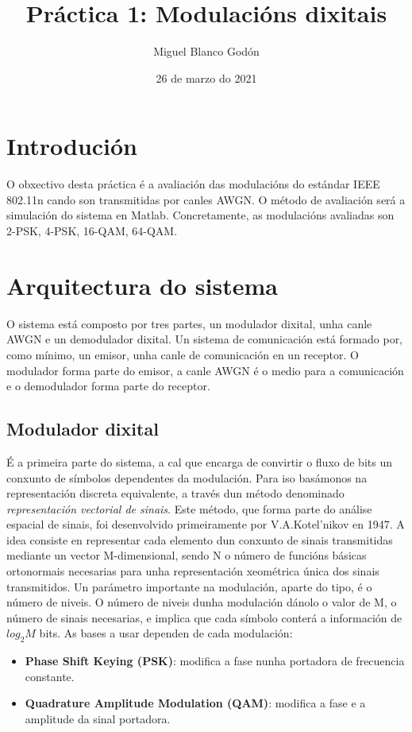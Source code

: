 \documentclass[
	10pt, %
	spanish, %
]{fphw}
\title{Práctica 1: Modulacións dixitais}
\author{Miguel Blanco Godón}
\date{26 de marzo do 2021}
\institute{Universidade da Coruña \\ Facultade de Informática}
\begin{document}
\maketitle 

\section*{Introdución}
O obxectivo desta práctica é a avaliación das modulacións do estándar IEEE 802.11n cando son transmitidas por canles AWGN. O método de avaliación será a simulación do sistema en Matlab.
Concretamente, as modulacións avaliadas son 2-PSK, 4-PSK, 16-QAM, 64-QAM.
\section*{Arquitectura do sistema}
O sistema está composto por tres partes, un modulador dixital, unha canle AWGN e un demodulador dixital. Un sistema de comunicación está formado por, como mínimo, un emisor, unha canle de comunicación en un receptor. O modulador forma parte do emisor, a canle AWGN é o medio para a comunicación e o demodulador forma parte do receptor.
\subsection*{Modulador dixital}
É a primeira parte do sistema, a cal que encarga de convirtir o fluxo de bits un conxunto de símbolos dependentes da modulación. Para iso basámonos na representación discreta equivalente, a través dun método denominado \textit{representación vectorial de sinais}. Este método, que forma parte do análise espacial de sinais, foi desenvolvido primeiramente por V.A.Kotel'nikov en 1947. A idea consiste en representar cada elemento dun conxunto de sinais transmitidas mediante un vector M-dimensional, sendo N o número de funcións básicas ortonormais necesarias para unha representación xeométrica única dos sinais transmitidos.
Un parámetro importante na modulación, aparte do tipo, é o número de niveis. O número de niveis dunha modulación dánolo o valor de M, o número de sinais necesarias, e implica que cada símbolo conterá  a información de $log_2{M}$ bits.
As bases a usar dependen de cada modulación:
\begin{itemize}
\item \textbf{Phase Shift Keying (PSK)}: modifica a fase nunha portadora de frecuencia constante.
\item \textbf{Quadrature Amplitude Modulation (QAM)}: modifica a fase e a amplitude da sinal portadora. 
\end{itemize}
\end{document}
